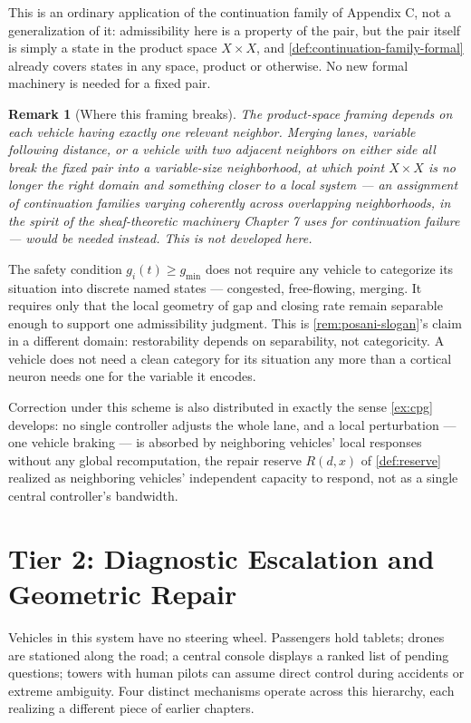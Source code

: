 \documentclass[12pt]{report}
\newtheorem{remark}[definition]{Remark}
\begin{document}
This is an ordinary application of the continuation family of Appendix
C, not a generalization of it: admissibility here is a property of the
pair, but the pair itself is simply a state in the product space $X
\times X$, and \cref{def:continuation-family-formal} already covers
states in any space, product or otherwise. No new formal machinery is
needed for a fixed pair.

\begin{remark}[Where this framing breaks]
The product-space framing depends on each vehicle having exactly one
relevant neighbor. Merging lanes, variable following distance, or a
vehicle with two adjacent neighbors on either side all break the fixed
pair into a variable-size neighborhood, at which point $X \times X$ is
no longer the right domain and something closer to a local system ---
an assignment of continuation families varying coherently across
overlapping neighborhoods, in the spirit of the sheaf-theoretic
machinery Chapter 7 uses for continuation failure --- would be needed
instead. This is not developed here.
\end{remark}

The safety condition $g_i(t) \geq g_{\min}$ does not require any vehicle
to categorize its situation into discrete named states --- congested,
free-flowing, merging. It requires only that the local geometry of gap
and closing rate remain separable enough to support one admissibility
judgment. This is \cref{rem:posani-slogan}'s claim in a different
domain: restorability depends on separability, not categoricity. A
vehicle does not need a clean category for its situation any more than
a cortical neuron needs one for the variable it encodes.

Correction under this scheme is also distributed in exactly the sense
\cref{ex:cpg} develops: no single controller adjusts the whole lane, and
a local perturbation --- one vehicle braking --- is absorbed by
neighboring vehicles' local responses without any global recomputation,
the repair reserve $R(d,x)$ of \cref{def:reserve} realized as
neighboring vehicles' independent capacity to respond, not as a single
central controller's bandwidth.

\section*{Tier 2: Diagnostic Escalation and Geometric Repair}

Vehicles in this system have no steering wheel. Passengers hold tablets;
drones are stationed along the road; a central console displays a
ranked list of pending questions; towers with human pilots can assume
direct control during accidents or extreme ambiguity. Four distinct
mechanisms operate across this hierarchy, each realizing a different
piece of earlier chapters.
\end{document}
